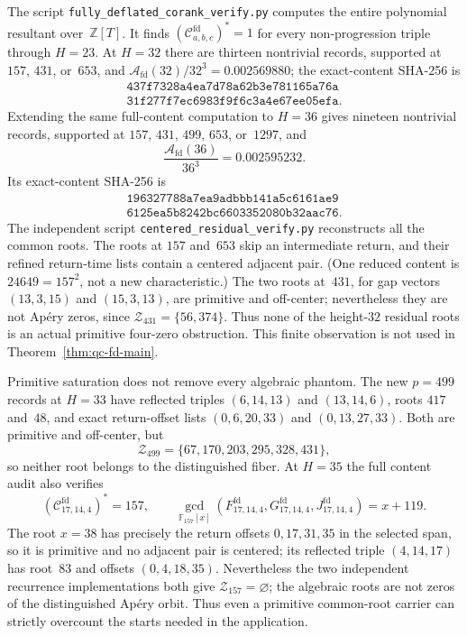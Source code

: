 \begin{remark}
\label{rem:qc-fd-computation}
The script \texttt{fully\_deflated\_corank\_verify.py} computes the
entire polynomial resultant over~$\mathbb Z[T]$.  It finds
$(\mathcal C^{\mathrm{fd}}_{a,b,c})^*=1$ for every non-progression
triple through $H=23$.  At $H=32$ there are thirteen nontrivial
records, supported at $157$, $431$, or~$653$, and
$\mathcal A_{\mathrm{fd}}(32)/32^3=0.002569880$; the exact-content
SHA-256 is
\[
 \begin{gathered}
  \texttt{437f7328a4ea7d78a62b3e781165a76a}\\
  \texttt{31f277f7ec6983f9f6c3a4e67ee05efa}.
 \end{gathered}
\]
Extending the same full-content computation to $H=36$ gives nineteen
nontrivial records, supported at $157$, $431$, $499$, $653$, or~$1297$, and
\[
 \frac{\mathcal A_{\mathrm{fd}}(36)}{36^3}=0.002595232.
\]
Its exact-content SHA-256 is
\[
 \begin{gathered}
  \texttt{196327788a7ea9adbbb141a5c6161ae9}\\
  \texttt{6125ea5b8242bc6603352080b32aac76}.
 \end{gathered}
\]
The independent script \texttt{centered\_residual\_verify.py}
reconstructs all the common roots.  The roots at $157$ and~$653$ skip
an intermediate return, and their refined return-time lists contain a
centered adjacent pair.  (One reduced content is
$24649=157^2$, not a new characteristic.)  The two roots at~$431$,
for gap vectors $(13,3,15)$ and $(15,3,13)$, are primitive and
off-center; nevertheless they are not Ap\'ery zeros, since
$\mathcal Z_{431}=\{56,374\}$.  Thus none of the height-$32$
residual roots is an actual primitive four-zero obstruction.  This
finite observation is not used in Theorem~\ref{thm:qc-fd-main}.

Primitive saturation does not remove every algebraic phantom.  The new
$p=499$ records at $H=33$ have reflected triples $(6,14,13)$ and
$(13,14,6)$, roots $417$ and~$48$, and exact return-offset lists
$(0,6,20,33)$ and $(0,13,27,33)$.  Both are primitive and off-center, but
\[
 \mathcal Z_{499}=\{67,170,203,295,328,431\},
\]
so neither root belongs to the distinguished fiber.  At $H=35$ the full
content audit also verifies
\[
 (\mathcal C^{\mathrm{fd}}_{17,14,4})^*=157,
 \qquad
 \gcd_{\mathbb F_{157}[x]}
  (F^{\mathrm{fd}}_{17,14,4},G^{\mathrm{fd}}_{17,14,4},
   J^{\mathrm{fd}}_{17,14,4})=x+119.
\]
The root $x=38$ has precisely the return offsets
$0,17,31,35$ in the selected span, so it is primitive and no adjacent
pair is centered; its reflected triple $(4,14,17)$ has root~$83$ and
offsets $(0,4,18,35)$.  Nevertheless the two independent recurrence
implementations both give $\mathcal Z_{157}=\varnothing$; the algebraic
roots are not zeros of the distinguished Ap\'ery orbit.  Thus even a
primitive common-root carrier can strictly overcount the starts needed
in the application.


\end{remark}
